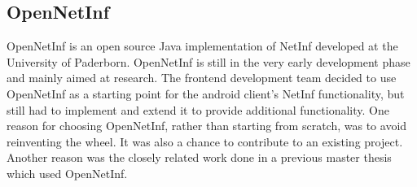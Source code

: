 \subsection{OpenNetInf}
OpenNetInf \cite{opennetinf} is an open source Java implementation of NetInf
 developed at the University of Paderborn. OpenNetInf is still in the very
 early development phase and mainly aimed at research. The frontend development
 team decided to use OpenNetInf as a starting point for the android client's
 NetInf functionality, but still had to implement and extend it to provide additional functionality. One reason for choosing OpenNetInf, rather than 
starting from scratch, was to avoid reinventing the wheel. It was also a 
chance to contribute to an existing project. Another reason was the closely
 related work done in a previous master thesis \cite{hugomiguel} which used 
OpenNetInf.
